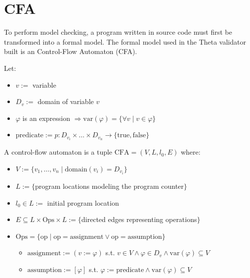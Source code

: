 
\section{CFA}

To perform model checking, a program written in source code must first be transformed into a formal model. 
The formal model used in the Theta validator built is an Control-Flow Automaton (CFA).

\begin{definition} Let:
\begin{itemize}
  \item $v :=$ variable
  \item $D_v :=$ domain of variable $v$
  \item $\varphi$ is an expression $\Rightarrow \mathrm{var}(\varphi) = \{\forall v \mid v \in \varphi\}$
  \item $\text{predicate} := p: D_{v_i} \times \dots \times D_{v_n} \to \{\text{true}, \text{false}\}$
\end{itemize}
A control-flow automaton is a tuple $\mathrm{CFA} = (V, L, l_0, E)$ where:
\begin{itemize}
  \item $V := \{v_1, \dots, v_n \mid \mathrm{domain}(v_i) = D_{v_i} \}$
  \item $L := \{$program locations modeling the program counter$\}$
  \item $l_0 \in L :=$ initial program location
  \item $E \subseteq L \times \mathrm{Ops} \times L := \{$directed edges representing operations$\}$
  \item $\mathrm{Ops} = \{ \mathrm{op} \mid \mathrm{op} = \text{assignment} \lor \mathrm{op} = \text{assumption} \}$
  \begin{itemize}
    \item $\text{assignment} := (v := \varphi)$ s.t. $v \in V \land \varphi \in D_v \land \mathrm{var}(\varphi) \subseteq V$
    \item $\text{assumption} := [\varphi]$ s.t. $\varphi := \text{predicate} \land \mathrm{var}(\varphi) \subseteq V$
  \end{itemize}
\end{itemize}
\end{definition}


